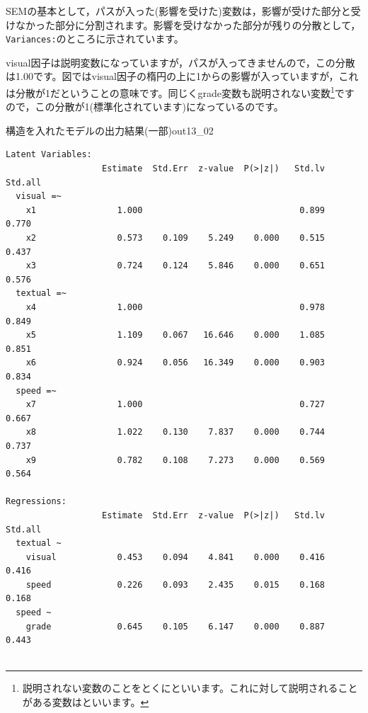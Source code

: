 \documentclass{ltjsbook}
\begin{document}
SEMの基本として，パスが入った(影響を受けた)変数は，影響が受けた部分と受けなかった部分に分割されます。影響を受けなかった部分が残りの分散として，\texttt{Variances:}のところに示されています。

visual因子は説明変数になっていますが，パスが入ってきませんので，この分散は1.00です。図ではvisual因子の楕円の上に1からの影響が入っていますが，これは分散が1だということの意味です。同じくgrade変数も説明されない変数\footnote{説明されない変数のことをとくにといいます。これに対して説明されることがある変数はといいます。}ですので，この分散が1(標準化されています)になっているのです。

\begin{Rscreen}{構造を入れたモデルの出力結果(一部)}{out13_02}
	\begin{verbatim}
Latent Variables:
                   Estimate  Std.Err  z-value  P(>|z|)   Std.lv  Std.all
  visual =~                                                             
    x1                1.000                               0.899    0.770
    x2                0.573    0.109    5.249    0.000    0.515    0.437
    x3                0.724    0.124    5.846    0.000    0.651    0.576
  textual =~                                                            
    x4                1.000                               0.978    0.849
    x5                1.109    0.067   16.646    0.000    1.085    0.851
    x6                0.924    0.056   16.349    0.000    0.903    0.834
  speed =~                                                              
    x7                1.000                               0.727    0.667
    x8                1.022    0.130    7.837    0.000    0.744    0.737
    x9                0.782    0.108    7.273    0.000    0.569    0.564

Regressions:
                   Estimate  Std.Err  z-value  P(>|z|)   Std.lv  Std.all
  textual ~                                                             
    visual            0.453    0.094    4.841    0.000    0.416    0.416
    speed             0.226    0.093    2.435    0.015    0.168    0.168
  speed ~                                                               
    grade             0.645    0.105    6.147    0.000    0.887    0.443


\end{verbatim}
\end{Rscreen}
\end{document}
